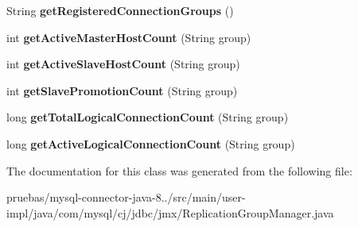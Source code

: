 \begin{DoxyCompactItemize}
\item 
\mbox{\label{classcom_1_1mysql_1_1cj_1_1jdbc_1_1jmx_1_1_replication_group_manager_ae3d3e1c40a74c776fc278037a495d994}} 
String {\bfseries get\+Registered\+Connection\+Groups} ()
\item 
\mbox{\label{classcom_1_1mysql_1_1cj_1_1jdbc_1_1jmx_1_1_replication_group_manager_aeaf341ab42e2a5aeddfbecc3fcca77aa}} 
int {\bfseries get\+Active\+Master\+Host\+Count} (String group)
\item 
\mbox{\label{classcom_1_1mysql_1_1cj_1_1jdbc_1_1jmx_1_1_replication_group_manager_a2117c9606bad33930ecdcb5544ee2f52}} 
int {\bfseries get\+Active\+Slave\+Host\+Count} (String group)
\item 
\mbox{\label{classcom_1_1mysql_1_1cj_1_1jdbc_1_1jmx_1_1_replication_group_manager_ab04bb89c8eddbbeb6fcf1dea8c3b85df}} 
int {\bfseries get\+Slave\+Promotion\+Count} (String group)
\item 
\mbox{\label{classcom_1_1mysql_1_1cj_1_1jdbc_1_1jmx_1_1_replication_group_manager_a674fa2c13d7ce64451573c38a63fda97}} 
long {\bfseries get\+Total\+Logical\+Connection\+Count} (String group)
\item 
\mbox{\label{classcom_1_1mysql_1_1cj_1_1jdbc_1_1jmx_1_1_replication_group_manager_a598cb188481a4d613050a2452d07e456}} 
long {\bfseries get\+Active\+Logical\+Connection\+Count} (String group)
\end{DoxyCompactItemize}


The documentation for this class was generated from the following file\+:\begin{DoxyCompactItemize}
\item 
pruebas/mysql-\/connector-\/java-\/8../src/main/user-\/impl/java/com/mysql/cj/jdbc/jmx/Replication\+Group\+Manager.\+java\end{DoxyCompactItemize}
